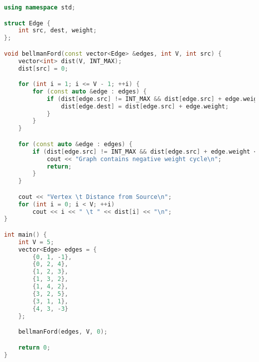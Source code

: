 \begin{enumerate}
\begin{lstlisting}[language=C++]
using namespace std;

struct Edge {
    int src, dest, weight;
};

void bellmanFord(const vector<Edge> &edges, int V, int src) {
    vector<int> dist(V, INT_MAX);
    dist[src] = 0;

    for (int i = 1; i <= V - 1; ++i) {
        for (const auto &edge : edges) {
            if (dist[edge.src] != INT_MAX && dist[edge.src] + edge.weight < dist[edge.dest]) {
                dist[edge.dest] = dist[edge.src] + edge.weight;
            }
        }
    }

    for (const auto &edge : edges) {
        if (dist[edge.src] != INT_MAX && dist[edge.src] + edge.weight < dist[edge.dest]) {
            cout << "Graph contains negative weight cycle\n";
            return;
        }
    }

    cout << "Vertex \t Distance from Source\n";
    for (int i = 0; i < V; ++i)
        cout << i << " \t " << dist[i] << "\n";
}

int main() {
    int V = 5;
    vector<Edge> edges = {
        {0, 1, -1},
        {0, 2, 4},
        {1, 2, 3},
        {1, 3, 2},
        {1, 4, 2},
        {3, 2, 5},
        {3, 1, 1},
        {4, 3, -3}
    };

    bellmanFord(edges, V, 0);

    return 0;
}
	\end{lstlisting}
\end{enumerate}
